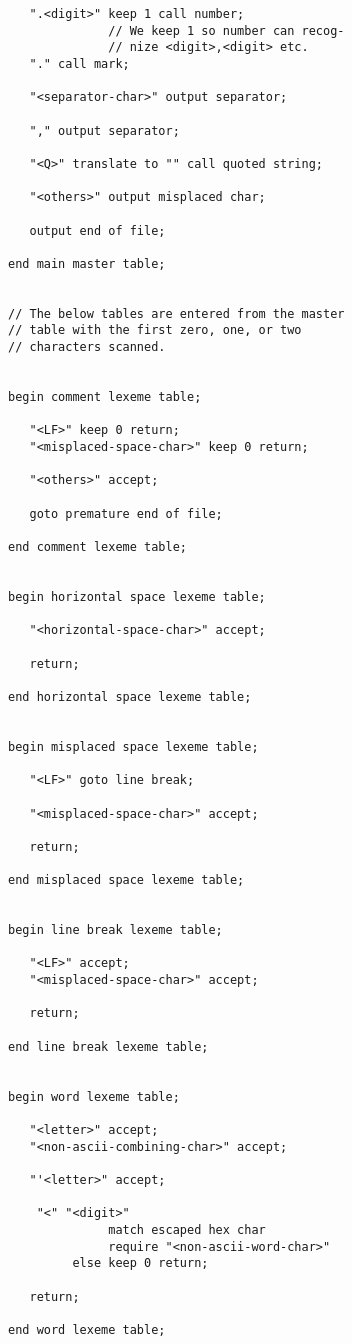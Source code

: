 \documentclass[12pt]{article}
\newenvironment{indpar}[1][0.3in]%
	{\begin{list}{}%
		     {\setlength{\itemsep}{0in}%
		      \setlength{\topsep}{0in}%
		      \setlength{\parsep}{1ex}%
		      \setlength{\labelwidth}{#1}%
		      \setlength{\leftmargin}{#1}%
		      \addtolength{\leftmargin}{\labelsep}}%
	 \item}%
	{\end{list}}
\begin{document}
\begin{indpar}
\begin{verbatim}
   ".<digit>" keep 1 call number;
              // We keep 1 so number can recog-
              // nize <digit>,<digit> etc.
   "." call mark;

   "<separator-char>" output separator;

   "," output separator;

   "<Q>" translate to "" call quoted string;

   "<others>" output misplaced char;

   output end of file;

end main master table;


// The below tables are entered from the master
// table with the first zero, one, or two
// characters scanned.


begin comment lexeme table;

   "<LF>" keep 0 return;
   "<misplaced-space-char>" keep 0 return;

   "<others>" accept;

   goto premature end of file;

end comment lexeme table;


begin horizontal space lexeme table;

   "<horizontal-space-char>" accept;

   return;

end horizontal space lexeme table;


begin misplaced space lexeme table;

   "<LF>" goto line break;

   "<misplaced-space-char>" accept;

   return;

end misplaced space lexeme table;


begin line break lexeme table;

   "<LF>" accept;
   "<misplaced-space-char>" accept;

   return;

end line break lexeme table;


begin word lexeme table;

   "<letter>" accept;
   "<non-ascii-combining-char>" accept;

   "'<letter>" accept;

    "<" "<digit>"
              match escaped hex char
              require "<non-ascii-word-char>"
         else keep 0 return;

   return;

end word lexeme table;



\end{verbatim}
\end{indpar}
\end{document}
